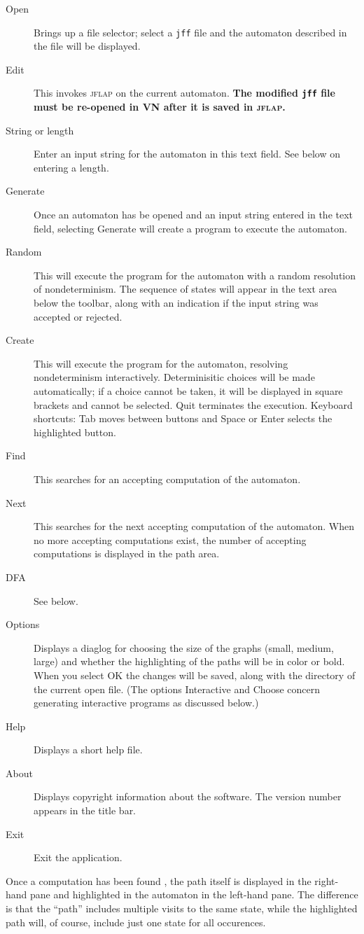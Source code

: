 \documentclass[11pt]{article}
\newcommand{\vn}{\textsc{VN}}
\newcommand{\jf}{\textsc{jflap}}
\newcommand{\p}[1]{\texttt{#1}}
\newcommand{\bu}[1]{\textsf{#1}}
\begin{document}
\begin{description}
\item[\bu{Open}] Brings up a file selector; select a \p{jff} file and the 
automaton described in the file will be displayed.
\item[\bu{Edit}] This invokes \jf{} on the current automaton.
\textbf{The modified \p{jff} file must be re-opened in \vn{} after it is
saved in \jf{}.}
\item[\bu{String or length}] Enter an input string for the automaton in this text field.
See below on entering a length.
\item[\bu{Generate}] Once an automaton has be opened and an input string entered in 
the text field, selecting \bu{Generate} will create a program to execute the 
automaton.
\item[\bu{Random}] This will execute the program for the automaton with a 
random resolution of nondeterminism. The sequence of states will appear in the 
text area below the toolbar, along with an indication if the input string was 
accepted or rejected.
\item[\bu{Create}] This will execute the program for the automaton, resolving 
nondeterminism interactively. Determinisitic choices will be made 
automatically; if a choice cannot be taken, it will be displayed in square 
brackets and cannot be selected. \bu{Quit} terminates the execution. Keyboard 
shortcuts: \bu{Tab} moves between buttons and \bu{Space} or \bu{Enter} selects the 
highlighted button.
\item[\bu{Find}] This searches for an accepting computation of the automaton.
\item[\bu{Next}] This searches for the next accepting computation of the automaton.
When no more accepting computations exist, the number of accepting computations
is displayed in the path area.
\item[\bu{DFA}] See below.
\item[\bu{Options}] Displays a diaglog for choosing the size of the graphs
(small, medium, large) and whether the highlighting of the paths will be in
color or bold. When you select \bu{OK} the changes will be saved, 
along with the directory of the current open file.
(The options \bu{Interactive} and \bu{Choose} concern generating
interactive programs as discussed below.)
\item[\bu{Help}] Displays a short help file.
\item[\bu{About}] Displays copyright information about the software. The 
version number appears in the title bar.
\item[\bu{Exit}] Exit the application.
\end{description}
Once a computation has been found , the path itself is displayed
in the right-hand pane and highlighted
in the automaton in the left-hand pane. The difference is that the 
``path'' includes multiple visits to the same state, while the highlighted path 
will, of course, include just one state for all occurences.
\end{document}
